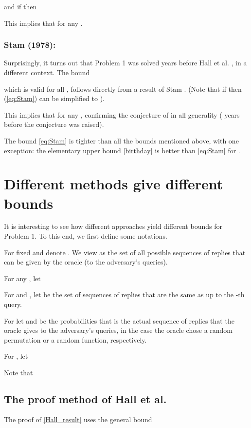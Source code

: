 \documentclass{llncs}
\numberwithin{equation}{section}
\numberwithin{lemma}{section}
\numberwithin{proposition}{section}
\begin{document}
and if  then


This implies that 
 for any .


\subsubsection{Stam \cite{Stam} (1978):}
Surprisingly, it turns out that Problem 1 was solved  years before Hall et al. \cite{Hall}, in a different context. The bound

which is valid for all , follows directly from a result of Stam \cite[Theorem 2.3]{Stam}. 
(Note that if  then (\ref{eq:Stam}) can be simplified to 
).

This implies that 
 for any , confirming the conjecture of \cite{Hall} in all generality ( years before the conjecture was raised). 

\begin{remark}
The bound \eqref{eq:Stam} is tighter than all the bounds mentioned above, with one exception: the elementary upper bound \eqref{birthday} is better than \eqref{eq:Stam} for . 
\end{remark}

\section{Different methods give different bounds}

It is interesting to see how different approaches yield different bounds for Problem 1. To this end, we first define some notations.

For fixed  and  denote . We view  as the set of all possible sequences of replies that can be given by the oracle (to the adversary's  queries).

\noindent For any  ,  let


\noindent 
For  and , let 
be the set of sequences of replies that are the same as  up to the -th query.  


For  let  and  be the probabilities that  is the actual sequence of replies that the oracle gives to the adversary's  queries, in the case the oracle chose a random permutation or a random function, respectively.


For , let 


\noindent 
Note that 


\subsection{The proof method of Hall et al.}
The proof of \eqref{Hall_result} uses the general bound 
\end{document}
